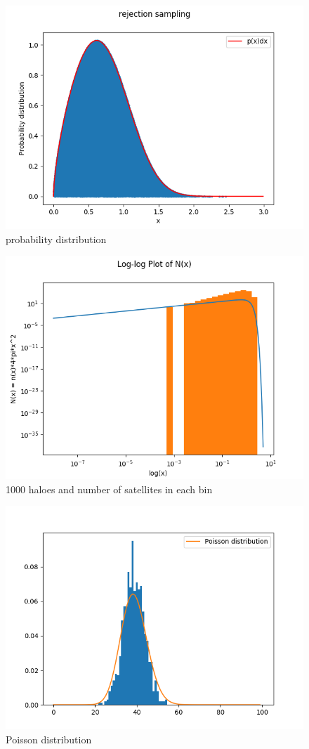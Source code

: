 \documentclass[a4paper,10pt]{article}
\begin{document}
\begin{figure}
    \centering
    \includegraphics[width=1.\linewidth]{2d.png}
    \caption{probability distribution}
    \label{fig:my_label}
\end{figure}
\begin{figure}
    \centering
    \includegraphics[width=1.\linewidth]{2e.png}
    \caption{1000 haloes and number of satellites in each bin}
    \label{fig:my_label}
\end{figure}
\begin{figure}
    \centering
    \includegraphics[width=1.\linewidth]{2g.png}
    \caption{Poisson distribution}
    \label{fig:my_label}
\end{figure}
\end{document}
